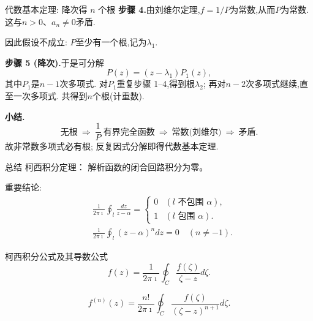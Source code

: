 \documentclass[fontset=windows, chinese, 10pt]{beamer}
\begin{document}
\begin{frame}{代数基本定理: 降次得 $n$ 个根}
\small
\textbf{步骤 4.}\quad 由刘维尔定理,$f=1/P$为常数,从而$P$为常数. 这与$n>0$、$a_n\neq 0$矛盾.

因此假设不成立: $P$至少有一个根,记为$\lambda_1$.

\textbf{步骤 5 (降次).}\quad 于是可分解
\[
    P(z)=(z-\lambda_1)P_1(z),
\]
其中$P_1$是$n-1$次多项式. 对$P_1$重复步骤 1--4,得到根$\lambda_2$; 再对$n-2$次多项式继续,直至一次多项式. 共得到$n$个根(计重数).

\textbf{小结.}\quad
\[
    \text{无根}\ \Longrightarrow\ \frac{1}{P}\ \text{有界完全函数}
    \ \Longrightarrow\ \text{常数(刘维尔)}
    \ \Longrightarrow\ \text{矛盾}.
\]
故非常数多项式必有根; 反复因式分解即得代数基本定理.
\end{frame}
 \begin{frame}{总结}
  \small
柯西积分定理： 解析函数的闭合回路积分为零。

重要结论:
$$
    \begin{aligned}
        & \frac{1}{2 \pi \imath} \oint_l \frac{d z}{z-\alpha}= \begin{cases}0 & (l \text { 不包围 } \alpha), \\
        1 & (l \text { 包围 } \alpha) . \end{cases} \\
        & \frac{1}{2 \pi \imath} \oint_l(z-\alpha)^n d z=0 \quad(n \neq-1) .
        \end{aligned}
  $$



  柯西积分公式及其导数公式
        \begin{equation*}
            f(z) = \frac{1}{2\pi \imath} \oint_C \frac{f(\zeta)}{\zeta - z} d \zeta.
        \end{equation*}

        \begin{equation*}
    f^{(n)}(z) = \frac{n!}{2\pi \imath} \oint_C \frac{f(\zeta)}{(\zeta - z)^{n+1}} d \zeta.
\end{equation*}

 \end{frame}

  
  
\end{document}
